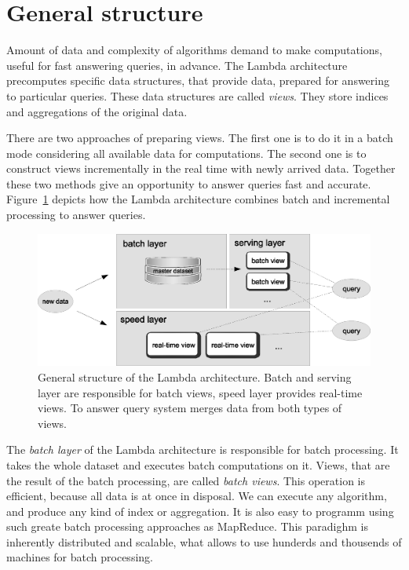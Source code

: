 \section{General structure}

Amount of data and complexity of algorithms demand to make computations, useful for fast answering queries, in advance.
The Lambda architecture precomputes specific data structures, that provide data, prepared for answering to particular queries.
These data structures are called \textit{views}.
They store indices and aggregations of the original data.

There are two approaches of preparing views.
The first one is to do it in a batch mode considering all available data for computations.
The second one is to construct views incrementally in the real time with newly arrived data.
Together these two methods give an opportunity to answer queries fast and accurate.
Figure~\ref{fig:lambda_architecture} depicts how the Lambda architecture combines batch and incremental processing to answer queries.

\begin{figure}[h]
  \centering
  \includegraphics [width=1.0\textwidth]{images/LambdaArchitecture}
  \caption{General structure of the Lambda architecture. Batch and serving layer are responsible for batch views, speed layer provides real-time views. To answer query system merges data from both types of views.}
  \label{fig:lambda_architecture}
\end{figure}

The \textit{batch layer} of the Lambda architecture is responsible for batch processing.
It takes the whole dataset and executes batch computations on it.
Views, that are the result of the batch processing, are called \textit{batch views}.
This operation is efficient, because all data is at once in disposal.
We can execute any algorithm, and produce any kind of index or aggregation.
It is also easy to programm using such greate batch processing approaches as MapReduce.
This paradighm is inherently distributed and scalable, what allows to use hunderds and thousends of machines for batch processing.

